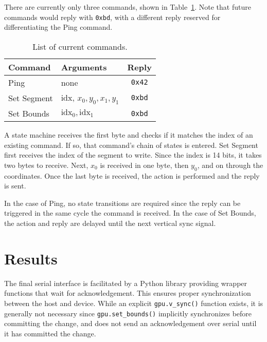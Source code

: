 \documentclass[11pt,conference]{IEEEtran}
\newcommand{\function}[2]{\texttt{#1(#2)}}
\begin{document}
There are currently only three commands, shown in Table~\ref{tab:cmd}.
Note that future commands would reply with \texttt{0xbd}, with a different reply reserved for differentiating the Ping command.

\begin{table}
	\center{}
	\caption{List of current commands.}%
	\label{tab:cmd}
	\begin{tabular}{l l c}
		\toprule
		Command & Arguments & Reply \\
		\midrule
		Ping        & none                             & \texttt{0x42} \\
		Set Segment & idx, $x_0, y_0, x_1, y_1$        & \texttt{0xbd} \\
		Set Bounds  & $\textrm{idx}_0, \textrm{idx}_1$ & \texttt{0xbd}
	\end{tabular}
\end{table}

A state machine receives the first byte and checks if it matches the index of an existing command.
If so, that command's chain of states is entered.
Set Segment first receives the index of the segment to write.
Since the index is 14 bits, it takes two bytes to receive.
Next, $x_0$ is received in one byte, then $y_0$, and on through the coordinates.
Once the last byte is received, the action is performed and the reply is sent.

In the case of Ping, no state transitions are required since the reply can be triggered in the same cycle the command is received.
In the case of Set Bounds, the action and reply are delayed until the next vertical sync signal.


\section{Results}
The final serial interface is facilitated by a Python library providing wrapper functions that wait for acknowledgement.
This ensures proper synchronization between the host and device.
While an explicit \function{gpu.v\_sync}{} function exists, it is generally not necessary since \function{gpu.set\_bounds}{} implicitly synchronizes before committing the change, and does not send an acknowledgement over serial until it has committed the change.
\end{document}
